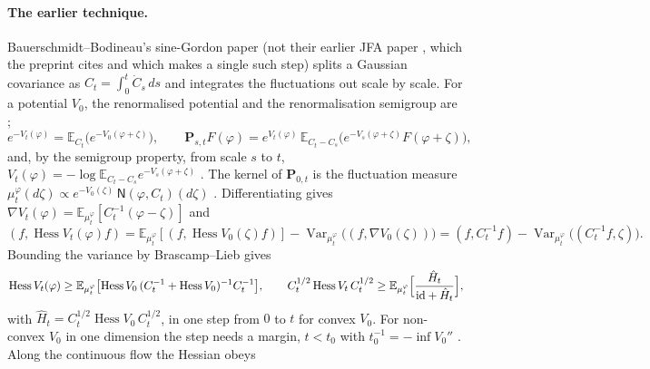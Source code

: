 \documentclass[11pt]{article}
\newcommand{\E}{\mathbb{E}}
\DeclareMathOperator{\Var}{Var}
\newcommand{\sloc}[2]{\cite[#2]{#1}}
\begin{document}
\paragraph{The earlier technique.}
Bauerschmidt--Bodineau's sine-Gordon paper
\cite{BauerschmidtBodineau2019-SineGordonMultiscaleBakryEmery} (not their
earlier JFA paper \cite{BauerschmidtBodineau2017-SimpleProofLSIHighTemp},
which the preprint cites and which makes a single such step) splits a
Gaussian covariance as $C_t=\int_0^t\dot C_s\,ds$ and integrates the
fluctuations out scale by scale. For a potential $V_0$, the renormalised
potential and the renormalisation semigroup are
\sloc{BauerschmidtBodineau2019-SineGordonMultiscaleBakryEmery}{(1.3)--(1.4), p.~2};
\sloc{BauerschmidtBodineauDagallier2023-PolchinskiIntroduction}{Def.~3.2, (3.11)--(3.12), p.~16}
\[
 e^{-V_t(\varphi)}=\mathbb E_{C_t}\bigl(e^{-V_0(\varphi+\zeta)}\bigr),\qquad
 \mathbf P_{s,t}F(\varphi)=e^{V_t(\varphi)}\,
 \mathbb E_{C_t-C_s}\bigl(e^{-V_s(\varphi+\zeta)}F(\varphi+\zeta)\bigr),
\]
and, by the semigroup property, from scale $s$ to $t$,
$V_t(\varphi)=-\log\mathbb E_{C_t-C_s}e^{-V_s(\varphi+\zeta)}$
\sloc{BauerschmidtBodineauDagallier2023-PolchinskiIntroduction}{proof of Lemma~3.11, p.~22}.
The kernel of $\mathbf P_{0,t}$ is the fluctuation measure
$\mu^\varphi_t(d\zeta)\propto e^{-V_0(\zeta)}\,\mathsf N(\varphi,C_t)(d\zeta)$
\sloc{BauerschmidtBodineauDagallier2023-PolchinskiIntroduction}{(3.17)--(3.18), p.~17}.
Differentiating gives $\nabla V_t(\varphi)=\E_{\mu_t^\varphi}[C_t^{-1}(\varphi-\zeta)]$
and
\sloc{BauerschmidtBodineauDagallier2023-PolchinskiIntroduction}{Lemma~3.12, (3.60)--(3.61), p.~23}
\[
 (f,\operatorname{Hess}V_t(\varphi)f)
 =\E_{\mu_t^\varphi}[(f,\operatorname{Hess}V_0(\zeta)f)]
   -\Var_{\mu_t^\varphi}\bigl((f,\nabla V_0(\zeta))\bigr)
 =(f,C_t^{-1}f)-\Var_{\mu_t^\varphi}\bigl((C_t^{-1}f,\zeta)\bigr).
\]
Bounding the variance by Brascamp--Lieb gives
\sloc{BauerschmidtBodineauDagallier2023-PolchinskiIntroduction}{Prop.~3.13, Proof~1, (3.63)--(3.65), p.~23}
\[
 \operatorname{Hess}V_t(\varphi)\ge
 \E_{\mu_t^\varphi}\bigl[\operatorname{Hess}V_0\,
   (C_t^{-1}+\operatorname{Hess}V_0)^{-1}C_t^{-1}\bigr],\qquad
 C_t^{1/2}\operatorname{Hess}V_t\,C_t^{1/2}\ge
 \E_{\mu_t^\varphi}\Bigl[\frac{\hat H_t}{\mathrm{id}+\hat H_t}\Bigr],
\]
with $\hat H_t=C_t^{1/2}\operatorname{Hess}V_0\,C_t^{1/2}$, in one step from
$0$ to $t$ for convex $V_0$.
For non-convex $V_0$ in one dimension the step needs a margin, $t<t_0$ with
$t_0^{-1}=-\inf V_0''$
\sloc{BauerschmidtBodineauDagallier2023-PolchinskiIntroduction}{Ex.~3.15, p.~26}.
Along the continuous flow the Hessian obeys
\end{document}
